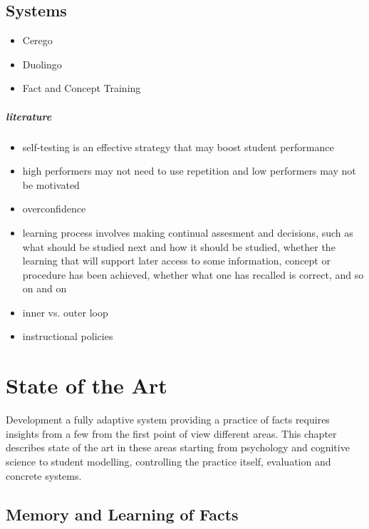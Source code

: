 \documentclass[table,color]{fithesis3/fithesis3}
\begin{document}
\section{Systems}

\begin{itemize}
	\item Cerego
	\item Duolingo~\cite{von2013duolingo, garcia2013learning}
	\item Fact and Concept Training~\cite{pavlik2007fact,pavlik2008using}
\end{itemize}

\paragraph{literature}

\begin{itemize}
	\item self-testing is an effective strategy that may boost student
		performance~\cite{bjork2013self}
	\item high performers may not need to use repetition and low performers may
		not be motivated~\cite{bjork2013self}
	\item overconfidence~\cite{bjork2013self, kornell2008optimising}
	\item learning process involves making continual assesment and decisions, such
	as what should be studied next and how it should be studied, whether the
	learning that will support later access to some information, concept or
	procedure has been achieved, whether what one has recalled is correct, and so
	on and on~\cite{bjork2013self}
	\item inner vs. outer loop~\cite{koedinger2013new}
	\item instructional policies~\cite{rollinson2015predictive}
\end{itemize}

\chapter{State of the Art}

Development a fully adaptive system providing a practice of facts requires
insights from a few from the first point of view different areas. This chapter
describes state of the art in these areas starting from psychology and
cognitive science to student modelling, controlling the practice itself,
evaluation and concrete systems.

\section{Memory and Learning of Facts}
\end{document}
